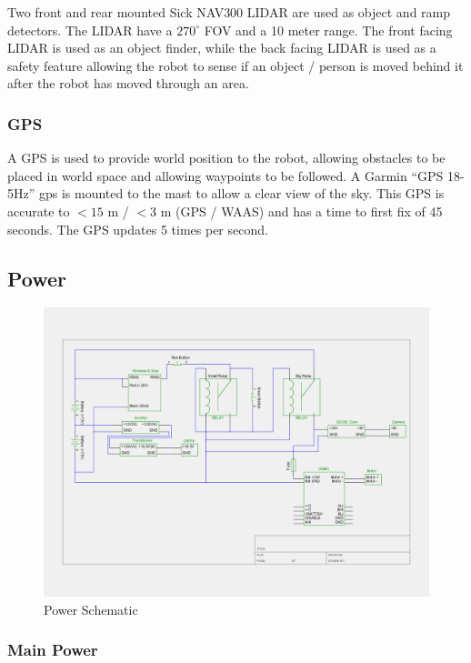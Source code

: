Two front and rear mounted Sick NAV300 LIDAR are used as object and ramp detectors. The LIDAR have a $270^{\circ}$ FOV and a 10 meter range. The front facing LIDAR is used as an object finder, while the back facing LIDAR is used as a safety feature allowing the robot to sense if an object / person is moved behind it after the robot has moved through an area.

\subsubsection{GPS}

A GPS is used to provide world position to the robot, allowing obstacles to be placed in world space and allowing waypoints to be followed. A Garmin ``GPS 18-5Hz'' gps is mounted to the mast to allow a clear view of the sky. This GPS is accurate to $<15$ m / $<3$ m (GPS / WAAS) and has a time to first fix of 45 seconds. The GPS updates 5 times per second.

\subsection{Power}

\begin{figure}[H]
\begin{center}
\includegraphics[width=6in]{./igvc_power.png}
\caption{Power Schematic}
\label{FIG:Power}
\end{center}
\end{figure}

\subsubsection{Main Power}

